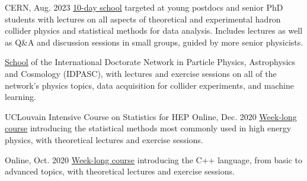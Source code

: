 
\begin{cventries}
    {}{CERN, Aug. 2023}
    {\href{https://indico.cern.ch/event/1234112/}{10-day school} targeted at young postdocs and senior PhD students with lectures on all aspects of theoretical and experimental hadron collider physics and statistical methods for data analysis. Includes lectures as well as Q\&A and discussion sessions in small groups, guided by more senior physicists.}\vspace*{2mm}

    {\href{https://indico.lip.pt/event/643}{School} of the International Doctorate Network in Particle Physics, Astrophysics and Cosmology (IDPASC), with lectures and exercise sessions on all of the network's physics topics, data acquisition for collider experiments, and machine learning.}\vspace*{2mm}
    
    \cventry
    {{UCLouvain Intensive Course on Statistics for HEP}}{}
    {}{Online, Dec. 2020}
    {\href{https://agenda.irmp.ucl.ac.be/event/4097/}{Week-long course} introducing the statistical methods most commonly used in high energy physics, with theoretical lectures and exercise sessions.}\vspace*{2mm}
    
    {}{Online, Oct. 2020}
    {\href{https://indico.cern.ch/event/946584}{Week-long course} introducing the C++ language, from basic to advanced topics, with theoretical lectures and exercise sessions.}\vspace*{2mm}
        




\end{cventries}

